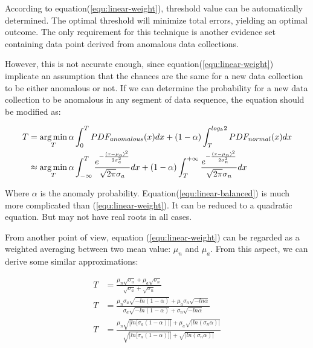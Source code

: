 \documentclass[a4paper]{IEEEtran}
\begin{document}
			According to equation(\ref{equ:linear-weight}), threshold value can be automatically determined. The optimal threshold will minimize total errors, yielding an optimal outcome. The only requirement for this technique is another evidence set containing data point derived from anomalous data collections.
			
			However, this is not accurate enough, since equation(\ref{equ:linear-weight}) implicate an assumption that the chances are the same for a new data collection to be either anomalous or not. If we can determine the probability for a new data collection to be anomalous in any segment of data sequence, the equation should be modified as:
			
			\begin{equation}\label{equ:linear-balanced}
				\small
				\begin{split}
					T & = \mathop{\arg\min}_{T} \alpha\int_{0}^{T}PDF_{anomalous}(x)dx +
				(1-\alpha)\int_{T}^{log_k2}PDF_{normal}(x)dx\\
					& \approx \mathop{\arg\min}_{T}
					\alpha\int_{-\infty}^{T}
					\frac{e^{-\frac{(x - \mu_a)^2}{2\sigma_a^2}}}{\sqrt{2\pi} \sigma_a}dx
					+ (1-\alpha)\int_{T}^{+\infty}
					\frac{e^{-\frac{(x - \mu_n)^2}{2\sigma_n^2}}}{\sqrt{2\pi} \sigma_n}dx
				\end{split}
			\end{equation}
			
			Where $\alpha$ is the anomaly probability. Equation(\ref{equ:linear-balanced}) is much more complicated than (\ref{equ:linear-weight}). It can be reduced to a quadratic equation. But may not have real roots in all cases.
			
			From another point of view, equation (\ref{equ:linear-weight}) can be regarded as a weighted averaging between two mean value: $\mu_n$ and $\mu_a$. From this aspect, we can derive some similar approximations:
			
			\begin{align}
				T &= \frac{\mu_n \sqrt{\sigma_a} + \mu_a \sqrt{\sigma_n}}{\sqrt{\sigma_a} + \sqrt{\sigma_n}}
				\label{equ:sqrt-weight}\\
				T &= \frac{\mu_n \sigma_a \sqrt{-ln(1 - \alpha)}
					+ \mu_a \sigma_n \sqrt{-ln\alpha}}
				{\sigma_a \sqrt{-ln(1 - \alpha)} + \sigma_n \sqrt{-ln\alpha}}
				\label{equ:sqrt-log-add-weight}\\
				T &= \frac{\mu_n \sqrt{|ln\big[\sigma_a (1 - \alpha)\big]|}
					+ \mu_a \sqrt{|ln(\sigma_n \alpha)|}}
				{\sqrt{|ln\big[\sigma_a (1 - \alpha)\big]|} + \sqrt{|ln(\sigma_n \alpha)|}}
				\label{equ:sqrt-log-combined-weight}
			\end{align}
			
\end{document}
